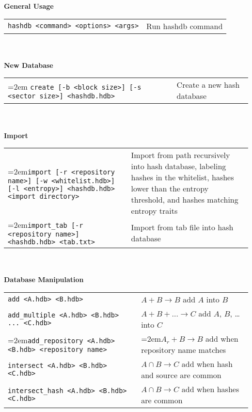 \begin{footnotesize}
\textbf{General Usage} \\
\begin{tabular}{p{3.6 in} p{3.0 in}}
\texttt{hashdb <command> <options> <args>} & Run hashdb command \\
\end{tabular}
\\
\\
\textbf{New Database} \\
\begin{tabular}{p{3.6 in} p{3.0 in}}
\hangindent=2em \texttt{create [-b <block size>] [-s <sector size>] <hashdb.hdb>} &
Create a new hash database \\
\end{tabular}
\\
\\
\textbf{Import} \\
\begin{tabular}{p{3.6 in} p{3.0 in}}
\hangindent=2em\texttt{import [-r <repository name>] [-w <whitelist.hdb>] [-l <entropy>] <hashdb.hdb> <import directory>} &
Import from path recursively into hash database, labeling hashes in the whitelist, hashes lower than the entropy threshold, and hashes matching entropy traits \\
\hangindent=2em\texttt{import\_tab [-r <repository name>] <hashdb.hdb> <tab.txt>} &
Import from tab file into hash database \\
\end{tabular}
\\
\\
\textbf{Database Manipulation} \\
\begin{tabular}{p{3.6 in} p{3.0 in}}
\texttt{add <A.hdb> <B.hdb>} & $A + B \rightarrow B$ add $A$ into $B$ \\
\texttt{add\_multiple <A.hdb> <B.hdb> ... <C.hdb>} & $A + B + \ldots \rightarrow C$ add $A$, $B$, \ldots into $C$\\
\hangindent=2em\texttt{add\_repository <A.hdb> <B.hdb> <repository name>} & \hangindent=2em$A_r + B \rightarrow B$ add when repository name matches \\
\texttt{intersect <A.hdb> <B.hdb> <C.hdb>} & $A \cap B \rightarrow C$ add when hash and source are common\\
\texttt{intersect\_hash <A.hdb> <B.hdb> <C.hdb>} & $A \cap B \rightarrow C$ add when hashes are common\\

\end{tabular}
\end{footnotesize}
